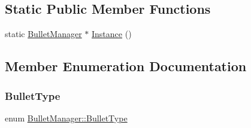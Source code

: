 \subsection*{Static Public Member Functions}
\begin{DoxyCompactItemize}
\item 
static \hyperlink{class_bullet_manager}{Bullet\+Manager} $\ast$ \hyperlink{class_bullet_manager_a03afa820ec61a56990097d6beb97d738}{Instance} ()
\end{DoxyCompactItemize}


\subsection{Member Enumeration Documentation}
\mbox{\label{class_bullet_manager_af49df9c4e5e7d87c13f2660851090580}} 
\subsubsection{\texorpdfstring{Bullet\+Type}{BulletType}}
{\footnotesize\ttfamily enum \hyperlink{class_bullet_manager_af49df9c4e5e7d87c13f2660851090580}{Bullet\+Manager\+::\+Bullet\+Type}}

